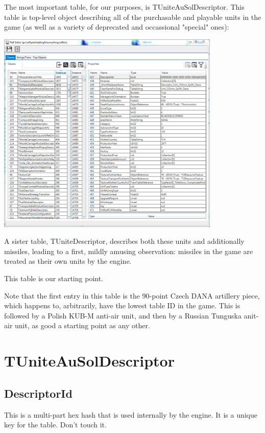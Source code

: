 \documentclass{article}
\begin{document}
The most important table, for our purposes, is TUniteAuSolDescriptor. This table is top-level object describing all of the purchasable and playable units in the game (as well as a variety of deprecated and occassional "special" ones):

\includegraphics[width=0.8\textwidth]{screenshot_everything}


A sister table, TUniteDescriptor, describes both these units and additionally missiles, leading to a first, mildly amusing observation: missiles in the game are treated as their own units by the engine.

This table is our starting point.

Note that the first entry in this table is the 90-point Czech DANA artillery piece, which happens to, arbitrarily, have the lowest table ID in the game. This is followed by a Polish KUB-M anti-air unit, and then by a Russian Tunguska anit-air unit, as good a starting point as any other. 

\newpage

\section{TUniteAuSolDescriptor}

\subsection{DescriptorId}

This is a multi-part hex hash that is used internally by the engine. It is a unique key for the table. Don't touch it.
\end{document}
